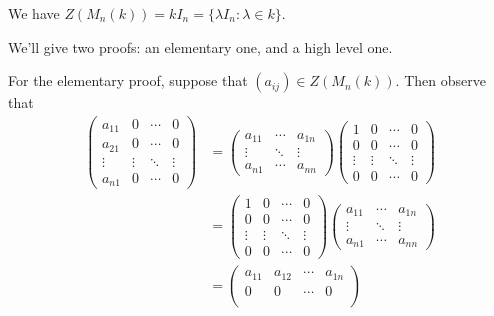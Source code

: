 \begin{prop}
    We have $Z(M_n(k)) = kI_n = \{\lambda I_n : \lambda \in k\}$. 
\end{prop}
\begin{pf}
    We'll give two proofs: an elementary one, and a high level one. 

    For the elementary proof, suppose that $(a_{ij}) \in Z(M_n(k))$. 
    Then observe that 
    \begin{align*} 
         \begin{pmatrix} 
            a_{11} & 0 & \cdots & 0 \\ 
            a_{21} & 0 & \cdots & 0 \\ 
            \vdots & \vdots & \ddots & \vdots \\ 
            a_{n1} & 0 & \cdots & 0 
        \end{pmatrix} &= \begin{pmatrix}
            a_{11} & \cdots & a_{1n} \\ 
            \vdots & \ddots & \vdots \\
            a_{n1} & \cdots & a_{nn} 
        \end{pmatrix} \begin{pmatrix} 
            1 & 0 & \cdots & 0 \\ 
            0 & 0 & \cdots & 0 \\
            \vdots & \vdots & \ddots & \vdots \\
            0 & 0 & \cdots & 0
        \end{pmatrix} \\ &= \begin{pmatrix} 
            1 & 0 & \cdots & 0 \\ 
            0 & 0 & \cdots & 0 \\
            \vdots & \vdots & \ddots & \vdots \\
            0 & 0 & \cdots & 0
        \end{pmatrix} \begin{pmatrix}
            a_{11} & \cdots & a_{1n} \\ 
            \vdots & \ddots & \vdots \\
            a_{n1} & \cdots & a_{nn} 
        \end{pmatrix} \\ &= \begin{pmatrix}
            a_{11} & a_{12} & \cdots & a_{1n} \\
            0 & 0 & \cdots & 0 \\ 

\end{pmatrix}
\end{align*}
\end{pf}
